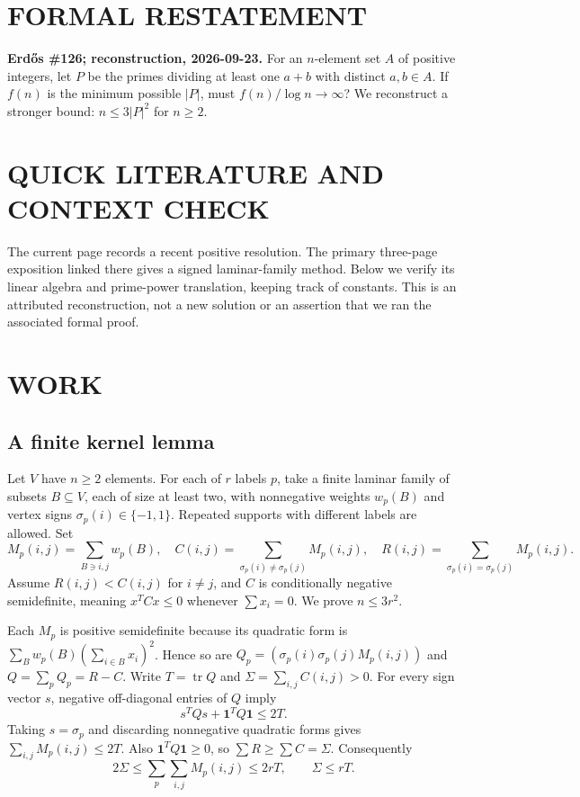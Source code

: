 \section{FORMAL RESTATEMENT}
\textbf{Erd\H{o}s \#126; reconstruction, 2026-09-23.}
For an $n$-element set $A$ of positive integers, let $P$ be the primes
dividing at least one $a+b$ with distinct $a,b\in A$. If $f(n)$ is the
minimum possible $|P|$, must $f(n)/\log n\to\infty$?
We reconstruct a stronger bound: $n\le3|P|^2$ for $n\ge2$.

\section{QUICK LITERATURE AND CONTEXT CHECK}
The current page records a recent positive resolution. The primary
three-page exposition linked there gives a signed laminar-family method.
Below we verify its linear algebra and prime-power translation, keeping
track of constants. This is an attributed reconstruction, not a new
solution or an assertion that we ran the associated formal proof.

\section{WORK}
\subsection*{A finite kernel lemma}
Let $V$ have $n\ge2$ elements. For each of $r$ labels $p$, take a finite
laminar family of subsets $B\subseteq V$, each of size at least two,
with nonnegative weights $w_p(B)$ and vertex signs $\sigma_p(i)\in\{-1,1\}$.
Repeated supports with different labels are allowed. Set
\[
 M_p(i,j)=\sum_{B\ni i,j}w_p(B),\quad
 C(i,j)=\sum_{\sigma_p(i)\ne\sigma_p(j)}M_p(i,j),\quad
 R(i,j)=\sum_{\sigma_p(i)=\sigma_p(j)}M_p(i,j).
\]
Assume $R(i,j)<C(i,j)$ for $i\ne j$, and $C$ is conditionally negative
semidefinite, meaning $x^TCx\le0$ whenever $\sum x_i=0$.
We prove $n\le3r^2$.

Each $M_p$ is positive semidefinite because its quadratic form is
$\sum_Bw_p(B)(\sum_{i\in B}x_i)^2$. Hence so are
$Q_p=(\sigma_p(i)\sigma_p(j)M_p(i,j))$ and $Q=\sum_pQ_p=R-C$.
Write $T=\operatorname{tr}Q$ and $\Sigma=\sum_{i,j}C(i,j)>0$.
For every sign vector $s$, negative off-diagonal entries of $Q$ imply
\[
 s^TQs+\mathbf1^TQ\mathbf1\le2T.
\]
Taking $s=\sigma_p$ and discarding nonnegative quadratic forms gives
$\sum_{i,j}M_p(i,j)\le2T$. Also $\mathbf1^TQ\mathbf1\ge0$, so
$\sum R\ge\sum C=\Sigma$. Consequently
\[
 2\Sigma\le\sum_p\sum_{i,j}M_p(i,j)\le2rT,
 \qquad\Sigma\le rT.                            \tag{1}
\]

